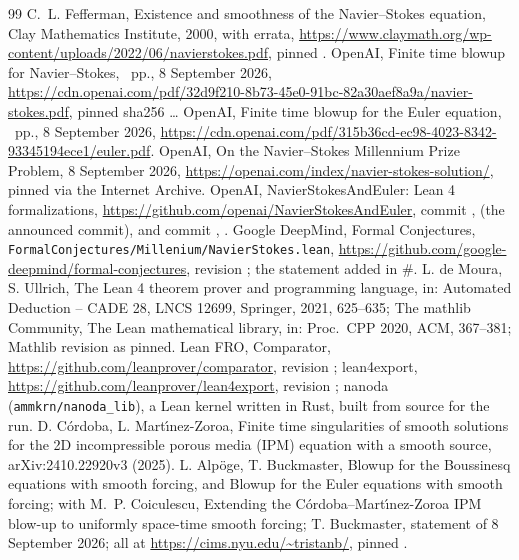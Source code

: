 \documentclass[11pt]{article}
\begin{document}
\begin{thebibliography}{99}\footnotesize
{} C.~L. Fefferman, Existence and smoothness of the Navier--Stokes equation,
Clay Mathematics Institute, 2000, with errata,
\url{https://www.claymath.org/wp-content/uploads/2022/06/navierstokes.pdf}, pinned \CorpusFetched.
 OpenAI, Finite time blowup for Navier--Stokes, \PaperPages~pp., 8 September
2026, \url{https://cdn.openai.com/pdf/32d9f210-8b73-45e0-91bc-82a30aef8a9a/navier-stokes.pdf}, pinned sha256 \texttt{\PaperSha}\ldots
{} OpenAI, Finite time blowup for the Euler equation, \EulerPages~pp., 8 September
2026, \url{https://cdn.openai.com/pdf/315b36cd-ec98-4023-8342-93345194ece1/euler.pdf}.
 OpenAI, On the Navier--Stokes Millennium Prize Problem, 8 September 2026,
\url{https://openai.com/index/navier-stokes-solution/}, pinned \CorpusFetched{} via the Internet Archive.
 OpenAI, NavierStokesAndEuler: Lean 4 formalizations,
\url{https://github.com/openai/NavierStokesAndEuler}, commit \texttt{\LeanCommit}, \LeanCommitDate{} (the
announced commit), and commit \texttt{\UpCommit}, \UpCommitDate.
 Google DeepMind, Formal Conjectures,
\texttt{FormalConjectures/Millenium/NavierStokes.lean},
\url{https://github.com/google-deepmind/formal-conjectures}, revision
\texttt{\FormalConjRev}; the statement added \FormalConjAdded{} in \#\FormalConjPR.
 L. de Moura, S. Ullrich, The Lean 4 theorem prover and programming
language, in: Automated Deduction -- CADE 28, LNCS 12699, Springer, 2021, 625--635; The
mathlib Community, The Lean mathematical library, in: Proc.\ CPP 2020, ACM, 367--381;
Mathlib revision \texttt{\MathlibRev} as pinned.
 Lean FRO, Comparator, \url{https://github.com/leanprover/comparator},
revision \texttt{\ComparatorRev}; lean4export,
\url{https://github.com/leanprover/lean4export}, revision \texttt{\LeanExportRev}; nanoda
(\texttt{ammkrn/nanoda\_lib}), a Lean kernel written in Rust, built from source for the run.
 D. C\'ordoba, L. Mart\'{\i}nez-Zoroa, Finite time singularities of smooth
solutions for the 2D incompressible porous media (IPM) equation with a smooth source,
arXiv:2410.22920v3 (2025).
 L. Alp\"oge, T. Buckmaster, Blowup for the Boussinesq equations with smooth
forcing, and Blowup for the Euler equations with smooth forcing; with M.~P. Coiculescu,
Extending the C\'ordoba--Mart\'{\i}nez-Zoroa IPM blow-up to uniformly space-time smooth
forcing; T. Buckmaster, statement of 8 September 2026; all at
\url{https://cims.nyu.edu/~tristanb/}, pinned \CorpusFetched.

\end{thebibliography}
\end{document}
